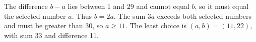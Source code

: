 The difference $b-a$ lies between 1 and 29 and cannot equal $b$, so it must equal the selected number $a$. Thus $b=2a$. The sum $3a$ exceeds both selected numbers and must be greater than 30, so $a\ge11$. The least choice is $\boxed{(a,b)=(11,22)}$, with sum 33 and difference 11.
